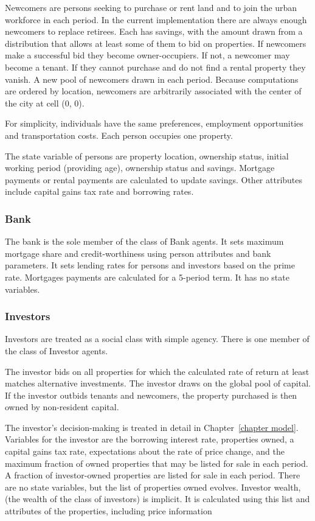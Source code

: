 Newcomers are persons seeking to purchase or rent land and to join the urban workforce in each period. In the current implementation there are always enough newcomers to replace retirees. Each has savings, with the amount drawn from a distribution that allows at least some of them to bid on properties. If newcomers make a successful bid they become owner-occupiers. If not, a newcomer may become a tenant. If they cannot purchase and do not find a rental property they vanish. A new pool of newcomers drawn in each period.  Because computations are ordered by location, newcomers are arbitrarily associated with the center of the city at cell (0, 0).  

For simplicity, individuals have the same preferences, employment opportunities and transportation costs.  Each person occupies one property.

The state variable of persons are property location, ownership status, initial working period (providing age),  ownership status and savings.  Mortgage payments or rental payments are calculated to update savings. Other attributes include capital gains tax rate and borrowing rates. 

\subsubsection{Bank}
The bank is the sole member of the class of Bank agents. It sets maximum mortgage share and credit-worthiness using person attributes and bank parameters. It sets lending rates for persons and investors based on the prime rate. Mortgages payments are calculated for a 5-period term. It has no state variables.
 
\subsubsection{Investors}
Investors are treated as a \gls{social class} with simple agency. There is one member of the class of Investor agents. 

The investor bids on all properties for which the calculated rate of return at least matches alternative investments. The investor draws on the global pool of capital. If the investor outbids tenants and newcomers, the property purchased is then owned by non-resident capital.  

The investor's decision-making is treated in detail in Chapter~\ref{chapter model}. Variables for the investor are the borrowing interest rate, properties owned, a capital gains tax rate, expectations about the rate of price change, and the maximum fraction of owned properties that may be listed for sale in each period. A fraction of investor-owned properties are listed for sale in each period. There are no  state variables, but the list of properties owned evolves. Investor wealth, (the wealth of the class of investors) is implicit. It is calculated using this list and attributes of the properties, including price information




